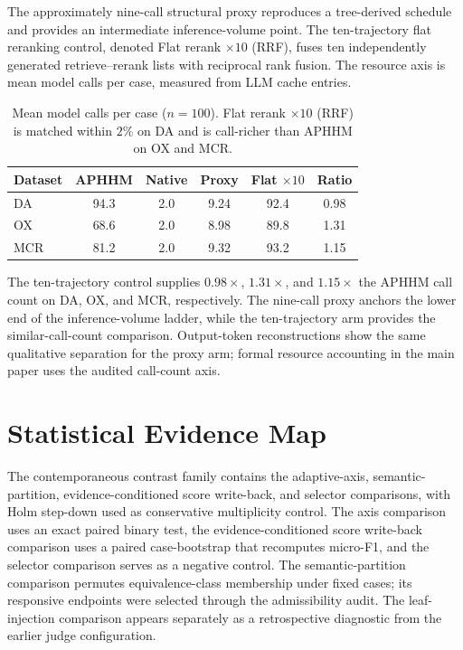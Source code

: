 \documentclass[letterpaper]{article}
\begin{document}
The approximately nine-call structural proxy reproduces a tree-derived schedule and provides an intermediate inference-volume point.
The ten-trajectory flat reranking control, denoted Flat rerank $\times 10$ (RRF), fuses ten independently generated retrieve--rerank lists with reciprocal rank fusion.
The resource axis is mean model calls per case, measured from LLM cache entries.

\begin{table}[tb]
\centering
\small
\begin{tabular}{@{}lccccc@{}}
\toprule
Dataset & APHHM & Native & Proxy & Flat $\times 10$ & Ratio \\
\midrule
DA & 94.3 & 2.0 & 9.24 & 92.4 & 0.98 \\
OX & 68.6 & 2.0 & 8.98 & 89.8 & 1.31 \\
MCR & 81.2 & 2.0 & 9.32 & 93.2 & 1.15 \\
\bottomrule
\end{tabular}
\caption{Mean model calls per case ($n{=}100$). Flat rerank $\times 10$ (RRF) is matched within $2\%$ on DA and is call-richer than APHHM on OX and MCR.}
\label{tab:compute-audit}
\end{table}

The ten-trajectory control supplies $0.98\times$, $1.31\times$, and $1.15\times$ the APHHM call count on DA, OX, and MCR, respectively.
The nine-call proxy anchors the lower end of the inference-volume ladder, while the ten-trajectory arm provides the similar-call-count comparison.
Output-token reconstructions show the same qualitative separation for the proxy arm; formal resource accounting in the main paper uses the audited call-count axis.

\section{Statistical Evidence Map}

The contemporaneous contrast family contains the adaptive-axis, semantic-partition, evidence-conditioned score write-back, and selector comparisons, with Holm step-down used as conservative multiplicity control.
The axis comparison uses an exact paired binary test, the evidence-conditioned score write-back comparison uses a paired case-bootstrap that recomputes micro-F1, and the selector comparison serves as a negative control.
The semantic-partition comparison permutes equivalence-class membership under fixed cases; its responsive endpoints were selected through the admissibility audit.
The leaf-injection comparison appears separately as a retrospective diagnostic from the earlier judge configuration.
\end{document}
